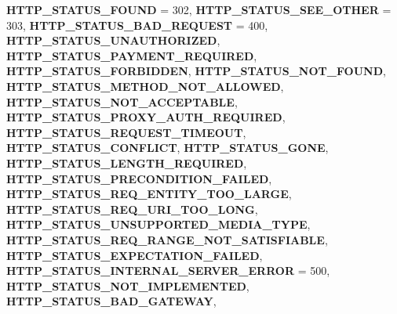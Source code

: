 \begin{DoxyCompactItemize}
{\bfseries H\+T\+T\+P\+\_\+\+S\+T\+A\+T\+U\+S\+\_\+\+F\+O\+U\+ND} = 302, 
{\bfseries H\+T\+T\+P\+\_\+\+S\+T\+A\+T\+U\+S\+\_\+\+S\+E\+E\+\_\+\+O\+T\+H\+ER} = 303, 
\newline
{\bfseries H\+T\+T\+P\+\_\+\+S\+T\+A\+T\+U\+S\+\_\+\+B\+A\+D\+\_\+\+R\+E\+Q\+U\+E\+ST} = 400, 
{\bfseries H\+T\+T\+P\+\_\+\+S\+T\+A\+T\+U\+S\+\_\+\+U\+N\+A\+U\+T\+H\+O\+R\+I\+Z\+ED}, 
{\bfseries H\+T\+T\+P\+\_\+\+S\+T\+A\+T\+U\+S\+\_\+\+P\+A\+Y\+M\+E\+N\+T\+\_\+\+R\+E\+Q\+U\+I\+R\+ED}, 
{\bfseries H\+T\+T\+P\+\_\+\+S\+T\+A\+T\+U\+S\+\_\+\+F\+O\+R\+B\+I\+D\+D\+EN}, 
\newline
{\bfseries H\+T\+T\+P\+\_\+\+S\+T\+A\+T\+U\+S\+\_\+\+N\+O\+T\+\_\+\+F\+O\+U\+ND}, 
{\bfseries H\+T\+T\+P\+\_\+\+S\+T\+A\+T\+U\+S\+\_\+\+M\+E\+T\+H\+O\+D\+\_\+\+N\+O\+T\+\_\+\+A\+L\+L\+O\+W\+ED}, 
{\bfseries H\+T\+T\+P\+\_\+\+S\+T\+A\+T\+U\+S\+\_\+\+N\+O\+T\+\_\+\+A\+C\+C\+E\+P\+T\+A\+B\+LE}, 
{\bfseries H\+T\+T\+P\+\_\+\+S\+T\+A\+T\+U\+S\+\_\+\+P\+R\+O\+X\+Y\+\_\+\+A\+U\+T\+H\+\_\+\+R\+E\+Q\+U\+I\+R\+ED}, 
\newline
{\bfseries H\+T\+T\+P\+\_\+\+S\+T\+A\+T\+U\+S\+\_\+\+R\+E\+Q\+U\+E\+S\+T\+\_\+\+T\+I\+M\+E\+O\+UT}, 
{\bfseries H\+T\+T\+P\+\_\+\+S\+T\+A\+T\+U\+S\+\_\+\+C\+O\+N\+F\+L\+I\+CT}, 
{\bfseries H\+T\+T\+P\+\_\+\+S\+T\+A\+T\+U\+S\+\_\+\+G\+O\+NE}, 
{\bfseries H\+T\+T\+P\+\_\+\+S\+T\+A\+T\+U\+S\+\_\+\+L\+E\+N\+G\+T\+H\+\_\+\+R\+E\+Q\+U\+I\+R\+ED}, 
\newline
{\bfseries H\+T\+T\+P\+\_\+\+S\+T\+A\+T\+U\+S\+\_\+\+P\+R\+E\+C\+O\+N\+D\+I\+T\+I\+O\+N\+\_\+\+F\+A\+I\+L\+ED}, 
{\bfseries H\+T\+T\+P\+\_\+\+S\+T\+A\+T\+U\+S\+\_\+\+R\+E\+Q\+\_\+\+E\+N\+T\+I\+T\+Y\+\_\+\+T\+O\+O\+\_\+\+L\+A\+R\+GE}, 
{\bfseries H\+T\+T\+P\+\_\+\+S\+T\+A\+T\+U\+S\+\_\+\+R\+E\+Q\+\_\+\+U\+R\+I\+\_\+\+T\+O\+O\+\_\+\+L\+O\+NG}, 
{\bfseries H\+T\+T\+P\+\_\+\+S\+T\+A\+T\+U\+S\+\_\+\+U\+N\+S\+U\+P\+P\+O\+R\+T\+E\+D\+\_\+\+M\+E\+D\+I\+A\+\_\+\+T\+Y\+PE}, 
\newline
{\bfseries H\+T\+T\+P\+\_\+\+S\+T\+A\+T\+U\+S\+\_\+\+R\+E\+Q\+\_\+\+R\+A\+N\+G\+E\+\_\+\+N\+O\+T\+\_\+\+S\+A\+T\+I\+S\+F\+I\+A\+B\+LE}, 
{\bfseries H\+T\+T\+P\+\_\+\+S\+T\+A\+T\+U\+S\+\_\+\+E\+X\+P\+E\+C\+T\+A\+T\+I\+O\+N\+\_\+\+F\+A\+I\+L\+ED}, 
{\bfseries H\+T\+T\+P\+\_\+\+S\+T\+A\+T\+U\+S\+\_\+\+I\+N\+T\+E\+R\+N\+A\+L\+\_\+\+S\+E\+R\+V\+E\+R\+\_\+\+E\+R\+R\+OR} = 500, 
{\bfseries H\+T\+T\+P\+\_\+\+S\+T\+A\+T\+U\+S\+\_\+\+N\+O\+T\+\_\+\+I\+M\+P\+L\+E\+M\+E\+N\+T\+ED}, 
\newline
{\bfseries H\+T\+T\+P\+\_\+\+S\+T\+A\+T\+U\+S\+\_\+\+B\+A\+D\+\_\+\+G\+A\+T\+E\+W\+AY}, 

\end{DoxyCompactItemize}
